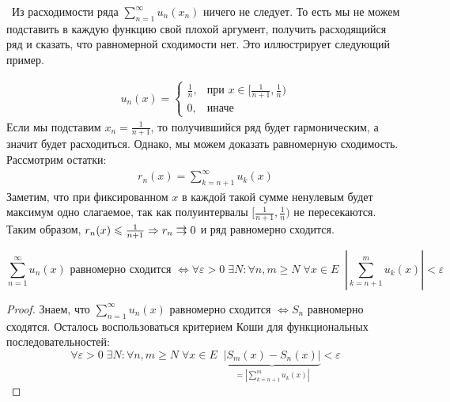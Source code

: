 \notice \, Из расходимости ряда $\sum\limits_{n = 1}^\infty u_n(x_n)$ ничего не следует.
То есть мы не можем подставить в каждую функцию свой плохой аргумент, получить расходящийся ряд и сказать, что равномерной сходимости нет.
Это иллюстрирует следующий пример.

\begin{example}
    \begin{gather*}
        u_n(x) = \begin{cases}
            \frac{1}{n}, & \text{при }x \in [\frac{1}{n + 1}, \frac{1}{n}) \\
            0, & \text{иначе}
        \end{cases}
    \end{gather*}
    \quad Если мы подставим $x_n = \frac{1}{n+1}$, то получившийся ряд будет гармоническим, а значит будет расходиться.
    Однако, мы можем доказать равномерную сходимость. 
    Рассмотрим остатки: 
    \begin{gather*}
        r_n(x) = \sum\limits_{k = n + 1}^\infty u_k(x)
    \end{gather*}
    Заметим, что при фиксированном $x$ в каждой такой сумме ненулевым будет максимум одно слагаемое, так как полуинтервалы $[\frac{1}{n+1}, \frac{1}{n})$ не пересекаются.
    Таким образом, $r_n(x) \leqslant \frac{1}{n+1} \Rightarrow r_n \doublerightarrow 0$ и ряд равномерно сходится.
\end{example}

\vspace*{7mm}

\begin{theorem} 
    \[ \sum_{n=1}^\infty u_n(x) \text{ равномерно сходится } \Longleftrightarrow \forall \varepsilon > 0 \; \exists N : \forall n,m \geqslant N \; \forall x \in E \;\; \left|\sum_{k=n+1}^m u_k(x)\right| < \varepsilon \]
\end{theorem}
\begin{proof}
    Знаем, что $ \sum\limits_{n=1}^\infty u_n(x)$ равномерно сходится $\Leftrightarrow S_n$ равномерно сходятся.
    Осталось воспользоваться критерием Коши для функциональных последовательностей:
    \[ \forall \varepsilon > 0 \; \exists N : \forall n,m \geqslant N \; \forall x \in E \;\; \underbrace{|S_m(x) - S_n(x)|}_{= \left|\sum\limits_{k=n+1}^m u_k(x)\right|} < \varepsilon  \] 
\end{proof}
